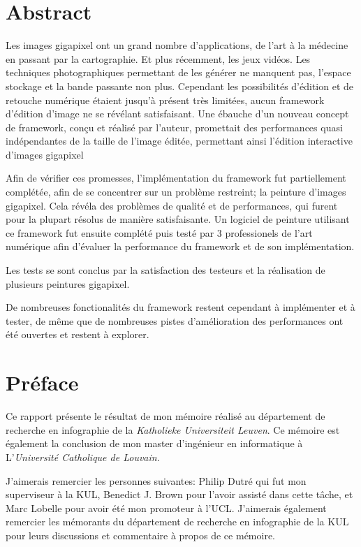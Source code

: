 
\chapter*{Abstract}
	Les images gigapixel ont un grand nombre d'applications, de l'art à la médecine en passant par la cartographie. Et plus 
	récemment, les jeux vidéos. Les techniques photographiques permettant de les générer ne manquent pas, l'espace stockage 
	et la bande passante non plus. Cependant les possibilités d'édition et de retouche numérique étaient jusqu'à présent 
	très limitées, aucun framework d'édition d'image ne se révélant satisfaisant. Une ébauche d'un nouveau concept de framework,
	conçu et réalisé par l'auteur, promettait des performances quasi indépendantes de la taille de l'image éditée, permettant ainsi 
	l'édition interactive d'images gigapixel

	Afin de vérifier ces promesses, l'implémentation du framework fut partiellement complétée, afin de se concentrer sur un problème restreint;
	la peinture d'images gigapixel. Cela révéla des problèmes de qualité et de performances,
	qui furent pour la plupart résolus de manière satisfaisante. Un logiciel de peinture utilisant ce framework fut ensuite 
	complété puis testé par 3 professionels de l'art numérique afin d'évaluer la performance du framework et de son implémentation. 

	Les tests se sont conclus par la satisfaction des testeurs et la réalisation de plusieurs peintures gigapixel. 

	De nombreuses fonctionalités du framework restent cependant à implémenter et à tester, de même que de nombreuses pistes
	d'amélioration des performances ont été ouvertes et restent à explorer.
	

\chapter*{Préface}
	Ce rapport présente le résultat de mon mémoire réalisé au département de recherche en infographie de la \emph{Katholieke Universiteit Leuven}.
	Ce mémoire est également la conclusion de mon master d'ingénieur en informatique à L'\emph{Université Catholique de Louvain}.

	J'aimerais remercier les personnes suivantes: Philip Dutré qui fut mon superviseur à la KUL, Benedict J. Brown pour l'avoir assisté dans cette
	tâche, et Marc Lobelle pour avoir été mon promoteur à l'UCL. J'aimerais également remercier les mémorants du département de recherche en infographie
	de la KUL pour leurs discussions et commentaire à propos de ce mémoire. 

